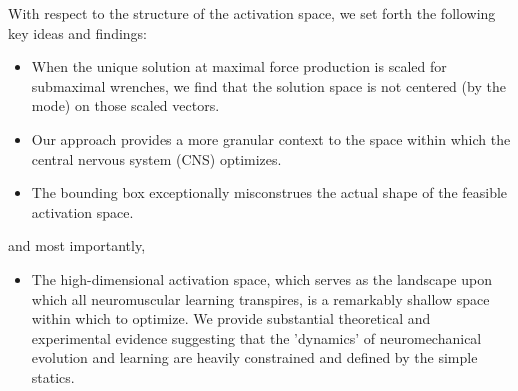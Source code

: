 With respect to the structure of the activation space, we set forth the following key ideas and findings:
\begin{itemize}
\item {When the unique solution at maximal force production is scaled for submaximal wrenches, we find that the solution space is not centered (by the mode) on those scaled vectors.}
\item {Our approach provides a more granular context to the space within which the central nervous system (CNS) optimizes.}
\item {The bounding box exceptionally misconstrues the actual shape of the feasible activation space.}
\end{itemize}
and most importantly,
\begin{itemize}
\item {The high-dimensional activation space, which serves as the landscape upon which all neuromuscular learning transpires, is a remarkably shallow space within which to optimize. We provide substantial theoretical and experimental evidence suggesting that the 'dynamics' of neuromechanical evolution and learning are heavily constrained and defined by the simple statics.}
\end{itemize}


